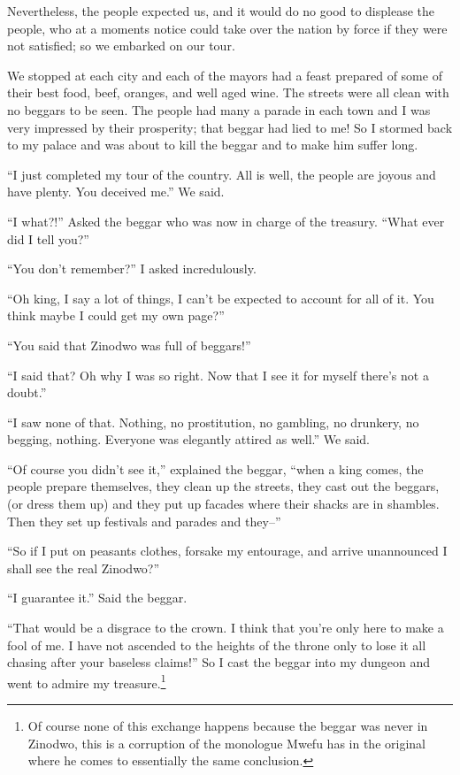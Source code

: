 Nevertheless, the people expected us, and it would do no good to displease the people, who at a moments notice could take over the nation by force if they were not satisfied; so we embarked on our tour. 

We stopped at each city and each of the mayors had a feast prepared of some of their best food, beef, oranges, and well aged wine. The streets were all clean with no beggars to be seen. The people had many a parade in each town and I was very impressed by their prosperity; that beggar had lied to me! So I stormed back to my palace and was about to kill the beggar and to make him suffer long.

``I just completed my tour of the country. All is well, the people are joyous and have plenty. You deceived me.'' We said.

``I what?!'' Asked the beggar who was now in charge of the treasury. ``What ever did I tell you?''

``You don't remember?'' I asked incredulously.

``Oh king, I say a lot of things, I can't be expected to account for all of it. You think maybe I could get my own page?''

``You said that Zinodwo was full of beggars!''

``I said that? Oh why I was so right. Now that I see it for myself there's not a doubt.''

``I saw none of that. Nothing, no prostitution, no gambling, no drunkery, no begging, nothing. Everyone was elegantly attired as well.'' We said.

``Of course you didn't see it,'' explained the beggar, ``when a king comes, the people prepare themselves, they clean up the streets, they cast out the beggars, (or dress them up) and they put up facades where their shacks are in shambles. Then they set up festivals and parades and they--''

``So if I put on peasants clothes, forsake my entourage, and arrive unannounced I shall see the real Zinodwo?''

``I guarantee it.'' Said the beggar.

``That would be a disgrace to the crown. I think that you're only here to make a fool of me. I have not ascended to the heights of the throne only to lose it all chasing after your baseless claims!'' So I cast the beggar into my dungeon and went to admire my treasure.\footnote{Of course none of this exchange happens because the beggar was never in Zinodwo, this is a corruption of the monologue Mwefu has in the original where he comes to essentially the same conclusion.}

